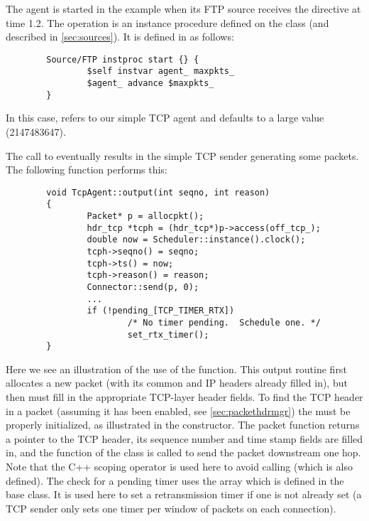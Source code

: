 \subsubsection{}

The  agent is started in the example when its
FTP source receives the  directive at time 1.2.
The  operation is an instance procedure defined on the
 class (and described in \ref{sec:sources}).
It is defined in  as follows:
\begin{small}
\begin{verbatim}
        Source/FTP instproc start {} {
                $self instvar agent_ maxpkts_
                $agent_ advance $maxpkts_
        }
\end{verbatim}
\end{small}
In this case,  refers to our simple TCP agent and
 defaults to a large value (2147483647).

The call to  eventually results in the simple TCP sender
generating some packets.  The following function 
performs this:
\begin{small}
\begin{verbatim}
        void TcpAgent::output(int seqno, int reason)
        {
                Packet* p = allocpkt();
                hdr_tcp *tcph = (hdr_tcp*)p->access(off_tcp_);
                double now = Scheduler::instance().clock();
                tcph->seqno() = seqno;
                tcph->ts() = now;
                tcph->reason() = reason;
                Connector::send(p, 0);
                ...
                if (!pending_[TCP_TIMER_RTX])
                        /* No timer pending.  Schedule one. */
                        set_rtx_timer();
        }
\end{verbatim}
\end{small}
Here we see an illustration of the use of the 
function.
This output routine first allocates a new packet
(with its common and IP headers already filled in), but then must fill
in the appropriate TCP-layer header fields.
To find the TCP header in a packet (assuming it has been enabled, see
\ref{sec:packethdrmgr}) the  must be properly initialized,
as illustrated in the constructor.
The packet  function returns a pointer to the TCP
header, its sequence number and time stamp fields are filled in,
and the  function of the  class is called
to send the packet downstream one hop.
Note that the C++ \code{::} scoping operator is used here to avoid
calling  (which is also defined).
The check for a pending timer uses the array  which
is defined in the  base class.
It is used here to set a retransmission timer if one is not already set
(a TCP sender only sets one timer per window of packets on each connection).


